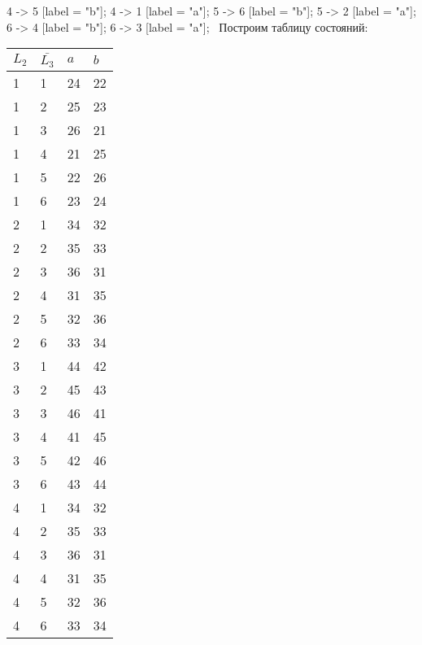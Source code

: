 \documentclass{article}
\begin{document}
\begin{enumerate}
{	4 -> 5 [label = "b"];
	4 -> 1 [label = "a"];
	5 -> 6 [label = "b"];
	5 -> 2 [label = "a"];
	6 -> 4 [label = "b"];
	6 -> 3 [label = "a"];
}
\newpage
\ Построим таблицу состояний: \\
\begin{table}[!htbp]
\centering
\begin{tabular}{|l|l|l|l|}
\hline
$L_{2}$ & $\bar{L_{3}}$ & $a$ & $b$ \\ \hline
1       & 1             & 24  & 22  \\ \hline
1       & 2             & 25  & 23  \\ \hline
1       & 3             & 26  & 21  \\ \hline
1       & 4             & 21  & 25  \\ \hline
1       & 5             & 22  & 26  \\ \hline
1       & 6             & 23  & 24  \\ \hline
2       & 1             & 34  & 32  \\ \hline
2       & 2             & 35  & 33  \\ \hline
2       & 3             & 36  & 31  \\ \hline
2       & 4             & 31  & 35  \\ \hline
2       & 5             & 32  & 36  \\ \hline
2       & 6             & 33  & 34  \\ \hline
3       & 1             & 44  & 42  \\ \hline
3       & 2             & 45  & 43  \\ \hline
3       & 3             & 46  & 41  \\ \hline
3       & 4             & 41  & 45  \\ \hline
3       & 5             & 42  & 46  \\ \hline
3       & 6             & 43  & 44  \\ \hline
4       & 1             & 34  & 32  \\ \hline
4       & 2             & 35  & 33  \\ \hline
4       & 3             & 36  & 31  \\ \hline
4       & 4             & 31  & 35  \\ \hline
4       & 5             & 32  & 36  \\ \hline
4       & 6             & 33  & 34  \\ \hline
\end{tabular}

\end{table}
\end{enumerate}
\end{document}
